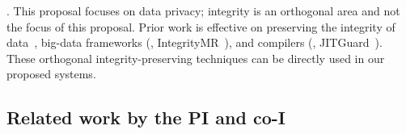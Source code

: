 
. This proposal focuses on data 
privacy; integrity is an orthogonal area and not the focus of this proposal. 
Prior work is effective on preserving the integrity of 
data~\cite{wang2015panda}, big-data frameworks (\eg, 
IntegrityMR~\cite{wang2013integritymr}), and compilers (\eg, 
JITGuard~\cite{jitguard:ccs17}). These orthogonal integrity-preserving 
techniques can be directly used in our proposed systems.







\vspace{-.15in}\subsection{Related work by the PI and co-I} 
\label{sec:my-work}\vspace{-.075in}
% 

